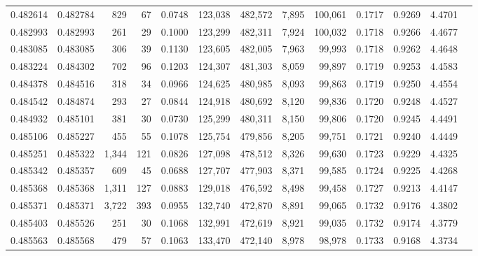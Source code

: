 \begin{tabular}{rrrrrrrrrrrrr}
0.482614 & 0.482784 &   829 &    67 &                                     0.0748 & 123,038 & 482,572 &   7,895 & 100,061 & 0.1717 & 0.9269 & 4.4701 \\
0.482993 & 0.482993 &   261 &    29 &                                     0.1000 & 123,299 & 482,311 &   7,924 & 100,032 & 0.1718 & 0.9266 & 4.4677 \\
0.483085 & 0.483085 &   306 &    39 &                                     0.1130 & 123,605 & 482,005 &   7,963 &  99,993 & 0.1718 & 0.9262 & 4.4648 \\
0.483224 & 0.484302 &   702 &    96 &                                     0.1203 & 124,307 & 481,303 &   8,059 &  99,897 & 0.1719 & 0.9253 & 4.4583 \\
0.484378 & 0.484516 &   318 &    34 &                                     0.0966 & 124,625 & 480,985 &   8,093 &  99,863 & 0.1719 & 0.9250 & 4.4554 \\
0.484542 & 0.484874 &   293 &    27 &                                     0.0844 & 124,918 & 480,692 &   8,120 &  99,836 & 0.1720 & 0.9248 & 4.4527 \\
0.484932 & 0.485101 &   381 &    30 &                                     0.0730 & 125,299 & 480,311 &   8,150 &  99,806 & 0.1720 & 0.9245 & 4.4491 \\
0.485106 & 0.485227 &   455 &    55 &                                     0.1078 & 125,754 & 479,856 &   8,205 &  99,751 & 0.1721 & 0.9240 & 4.4449 \\
0.485251 & 0.485322 & 1,344 &   121 &                                     0.0826 & 127,098 & 478,512 &   8,326 &  99,630 & 0.1723 & 0.9229 & 4.4325 \\
0.485342 & 0.485357 &   609 &    45 &                                     0.0688 & 127,707 & 477,903 &   8,371 &  99,585 & 0.1724 & 0.9225 & 4.4268 \\
0.485368 & 0.485368 & 1,311 &   127 &                                     0.0883 & 129,018 & 476,592 &   8,498 &  99,458 & 0.1727 & 0.9213 & 4.4147 \\
0.485371 & 0.485371 & 3,722 &   393 &                                     0.0955 & 132,740 & 472,870 &   8,891 &  99,065 & 0.1732 & 0.9176 & 4.3802 \\
0.485403 & 0.485526 &   251 &    30 &                                     0.1068 & 132,991 & 472,619 &   8,921 &  99,035 & 0.1732 & 0.9174 & 4.3779 \\
0.485563 & 0.485568 &   479 &    57 &                                     0.1063 & 133,470 & 472,140 &   8,978 &  98,978 & 0.1733 & 0.9168 & 4.3734 \\

\end{tabular}
